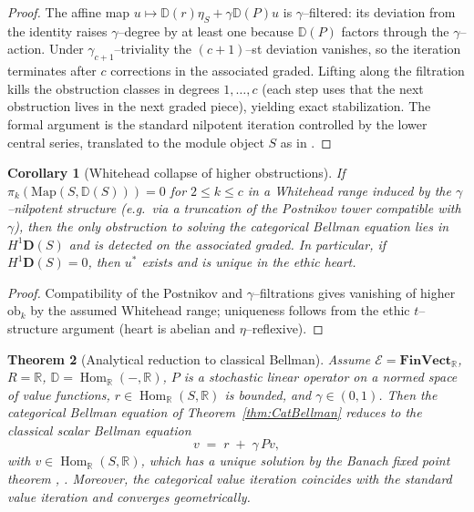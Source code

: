 \documentclass[12pt]{article}
\newcommand{\FinVect}{\mathbf{FinVect}}
\newcommand{\RR}{\mathbb{R}}
\newcommand{\ob}{\mathrm{ob}}
\newcommand{\E}{\mathcal{E}}
\newcommand{\DD}{\mathbb{D}}
\newcommand{\Hom}{\operatorname{Hom}}
\theoremstyle{plain}
\newtheorem{theorem}{Theorem}[section]
\newtheorem{corollary}[theorem]{Corollary}
\theoremstyle{definition}
\theoremstyle{remark}
\numberwithin{equation}{section}
\begin{document}
\begin{proof}
The affine map $u\mapsto \DD(r)\eta_S+\gamma\DD(P)u$ is $\gamma$–filtered: its deviation from the identity raises $\gamma$–degree by at least one because $\DD(P)$ factors through the $\gamma$–action. Under $\gamma_{c+1}$–triviality the $(c{+}1)$–st deviation vanishes, so the iteration terminates after $c$ corrections in the associated graded. Lifting along the filtration kills the obstruction classes in degrees $1,\dots,c$ (each step uses that the next obstruction lives in the next graded piece), yielding exact stabilization. The formal argument is the standard nilpotent iteration controlled by the lower central series, translated to the module object $S$ as in \cite{MikhailovSingh2011}.
\end{proof}

\begin{corollary}[Whitehead collapse of higher obstructions]\label{cor:Whitehead}
If $\pi_k(\mathrm{Map}(S,\DD(S)))=0$ for $2\le k\le c$ in a Whitehead range induced by the $\gamma$–nilpotent structure (e.g.\ via a truncation of the Postnikov tower compatible with $\gamma$), then the only obstruction to solving the categorical Bellman equation lies in $H^1\mathbf D(S)$ and is detected on the associated graded. In particular, if $H^1\mathbf D(S)=0$, then $u^\ast$ exists and is unique in the ethic heart. \cite{Whitehead1949,Postnikov1952}
\end{corollary}

\begin{proof}
Compatibility of the Postnikov and $\gamma$–filtrations gives vanishing of higher $\ob_{k}$ by the assumed Whitehead range; uniqueness follows from the ethic $t$–structure argument (heart is abelian and $\eta$–reflexive).
\end{proof}

\begin{theorem}[Analytical reduction to classical Bellman]\label{thm:Analytic}
Assume $\E=\FinVect_{\RR}$, $R=\RR$, $\DD=\Hom_{\RR}(-,\RR)$, $P$ is a stochastic linear operator on a normed space of value functions, $r\in \Hom_{\RR}(S,\RR)$ is bounded, and $\gamma\in(0,1)$. Then the categorical Bellman equation of Theorem~\ref{thm:CatBellman} reduces to the classical scalar Bellman equation
\[
v \;=\; r \;+\; \gamma\, P v,
\]
with $v\in \Hom_{\RR}(S,\RR)$, which has a unique solution by the Banach fixed point theorem \cite{BertsekasTsitsiklis1996}, \cite{Puterman1994}. Moreover, the categorical value iteration coincides with the standard value iteration and converges geometrically.
\end{theorem}
\end{document}
